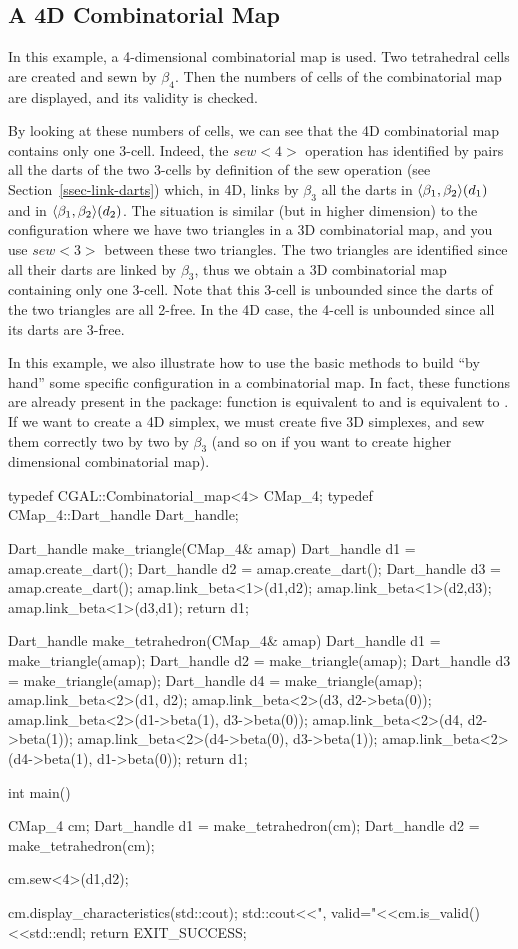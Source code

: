 \subsection{A 4D Combinatorial Map}
In this example, a 4-dimensional combinatorial map is used.  Two
tetrahedral cells are created and sewn by $\beta_4$.  Then the numbers
of cells of the combinatorial map are displayed, and its validity is
checked. 

By looking at these numbers of cells, we can see that the 4D
combinatorial map contains only one 3-cell. Indeed, the $sew<4>$
operation has identified by pairs all the darts of the two 3-cells
by definition of the sew operation (see Section~\ref{ssec-link-darts})
which, in 4D, links by $\beta_3$ all the darts in
$\langle{}\beta_{1},\beta_{2}\rangle{}(d_1)$ and in $\langle{}\beta_{1},\beta_{2}\rangle{}(d_2)$.  The
situation is similar (but in higher dimension) to the
configuration where we have two triangles in a 3D combinatorial map,
and you use $sew<3>$ between these two triangles. The two triangles
are identified since all their darts are linked by $\beta_3$, thus we
obtain a 3D combinatorial map containing only one 3-cell. Note that
this 3-cell is unbounded since the darts of the two triangles are all
2-free. In the 4D case, the 4-cell is unbounded since all its darts
are 3-free.

In this example, we also illustrate how to use the basic methods to
build ``by hand'' some specific configuration in a combinatorial
map. In fact, these functions are already present in the package:
function  is equivalent to
 and
 is equivalent to
.  If we want to create a 4D
simplex, we must create five 3D simplexes, and sew them correctly
two by two by $\beta_3$ (and so on if you want to create higher
dimensional combinatorial map).

\begin{ccExampleCode}
typedef CGAL::Combinatorial_map<4> CMap_4;
typedef CMap_4::Dart_handle Dart_handle;

Dart_handle make_triangle(CMap_4& amap)
{
 Dart_handle d1 = amap.create_dart();
 Dart_handle d2 = amap.create_dart();
 Dart_handle d3 = amap.create_dart();
 amap.link_beta<1>(d1,d2);
 amap.link_beta<1>(d2,d3);
 amap.link_beta<1>(d3,d1);
 return d1;
}
 
Dart_handle make_tetrahedron(CMap_4& amap)
{
  Dart_handle d1 = make_triangle(amap);
  Dart_handle d2 = make_triangle(amap);
  Dart_handle d3 = make_triangle(amap);
  Dart_handle d4 = make_triangle(amap);
  amap.link_beta<2>(d1, d2);
  amap.link_beta<2>(d3, d2->beta(0));
  amap.link_beta<2>(d1->beta(1), d3->beta(0));
  amap.link_beta<2>(d4, d2->beta(1));
  amap.link_beta<2>(d4->beta(0), d3->beta(1));
  amap.link_beta<2>(d4->beta(1), d1->beta(0));
  return d1;
}

int main()
{
  CMap_4 cm;
  Dart_handle d1 = make_tetrahedron(cm);
  Dart_handle d2 = make_tetrahedron(cm);
  
  cm.sew<4>(d1,d2);
  
  cm.display_characteristics(std::cout);
  std::cout<<", valid="<<cm.is_valid()<<std::endl;
  return EXIT_SUCCESS;
}
\end{ccExampleCode}

